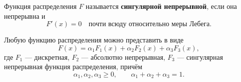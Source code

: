 
\begin{definition}
    Функция распределения $F$ называется \textbf{сингулярной непрерывной},
    если она непрерывна и
    \[
        F'(x)=0
        \quad\text{почти всюду относительно меры Лебега}.
    \]
\end{definition}

\begin{theorem}
    Любую функцию распределения можно представить в виде
    \[
        F(x)=\alpha_1F_1(x)+\alpha_2F_2(x)+\alpha_3F_3(x),
    \]
    где $F_1$ --- дискретная, $F_2$ --- абсолютно непрерывная,
    $F_3$ --- сингулярная непрерывная функция распределения, причём
    \[
        \alpha_1,\alpha_2,\alpha_3\geq0,
        \qquad \alpha_1+\alpha_2+\alpha_3=1.
    \]
\end{theorem}

